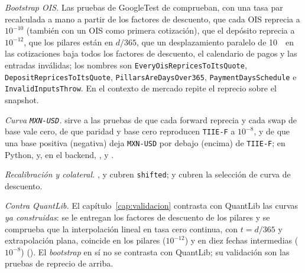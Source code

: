 \begingroup\raggedright
\emph{Bootstrap OIS.} Las pruebas de GoogleTest de
 comprueban, con una tasa par recalculada a mano a partir de los
factores de descuento, que cada OIS reprecia a $10^{-10}$ (también con un OIS como primera cotización), que el
depósito reprecia a $10^{-12}$, que los pilares están en $d/365$, que un desplazamiento paralelo de 10~\pb\ en las
cotizaciones baja todos los factores de descuento, el calendario de pagos y las entradas inválidas; los nombres son
\texttt{EveryOisRepricesToItsQuote}, \texttt{DepositRepricesToItsQuote}, \texttt{PillarsAreDaysOver365},
\texttt{PaymentDaysSchedule} e \texttt{InvalidInputsThrow}. En el contexto de mercado
 repite el reprecio sobre el
snapshot.

\emph{Curva \texttt{MXN-USD}.}  sirve a las pruebas de que cada
forward reprecia y cada swap de base vale cero, de que paridad y base cero reproducen \texttt{TIIE-F} a $10^{-8}$,
y de que una base positiva (negativa) deja \texttt{MXN-USD} por debajo (encima) de \texttt{TIIE-F}; en Python,
 y, en el backend,
,
 y
.

\emph{Recalibración y colateral.}
,
 y
 cubren
\texttt{shifted}; 
y  cubren
la selección de curva de descuento.

\emph{Contra QuantLib.} El capítulo~\ref{cap:validacion} contrasta con QuantLib las curvas \emph{ya construidas}: se
le entregan los factores de descuento de los pilares y se comprueba que la interpolación lineal en tasa cero
continua, con $t=d/365$ y extrapolación plana, coincide en los pilares ($10^{-12}$) y en diez fechas intermedias
($10^{-8}$) (). El \emph{bootstrap} en sí no se contrasta con
QuantLib; su validación son las pruebas de reprecio de arriba.
\endgroup

